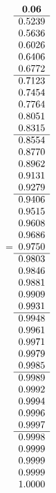 =\hbox{$\begin{array}{c}
\bf 0.06 
 \\ \hline 
  0.5239 \\ 
  0.5636 \\ 
  0.6026 \\ 
  0.6406 \\ 
  0.6772
 \\ \hline 
  0.7123 \\ 
  0.7454 \\ 
  0.7764 \\ 
  0.8051 \\ 
  0.8315
 \\ \hline 
  0.8554 \\ 
  0.8770 \\ 
  0.8962 \\ 
  0.9131 \\ 
  0.9279
 \\ \hline 
  0.9406 \\ 
  0.9515 \\ 
  0.9608 \\ 
  0.9686 \\ 
  0.9750
 \\ \hline 
  0.9803 \\ 
  0.9846 \\ 
  0.9881 \\ 
  0.9909 \\ 
  0.9931
 \\ \hline 
  0.9948 \\ 
  0.9961 \\ 
  0.9971 \\ 
  0.9979 \\ 
  0.9985
 \\ \hline 
  0.9989 \\ 
  0.9992 \\ 
  0.9994 \\ 
  0.9996 \\ 
  0.9997
 \\ \hline 
  0.9998 \\ 
  0.9999 \\ 
  0.9999 \\ 
  0.9999 \\ 
  1.0000
 \end{array}$}
